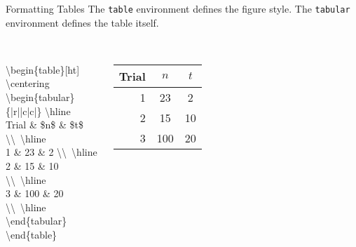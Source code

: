 \begin{frame}{Formatting Tables}
The \texttt{table} environment defines the figure style. The \texttt{tabular} environment defines the table itself.\\
~\\
\begin{columns}

\textbackslash begin\{table\}[ht] \\
\hspace{.5cm}\textbackslash centering \\
\hspace{.5cm}\textbackslash begin\{tabular\}\{|r||c|c|\} \textbackslash hline \\
\hspace{1cm}Trial \& \$n\$ \& \$t\$ \textbackslash\textbackslash~\textbackslash hline \\
\hspace{1cm}1 \& 23 \& 2 \textbackslash\textbackslash~\textbackslash hline \\
\hspace{1cm}2 \& 15 \& 10 \textbackslash\textbackslash~\textbackslash hline \\
\hspace{1cm}3 \& 100 \& 20 \textbackslash\textbackslash~\textbackslash hline \\
\hspace{.5cm}\textbackslash end\{tabular\} \\
\textbackslash end\{table\}

\begin{table}
\centering
\begin{tabular}{|r||c|c|} \hline
Trial & $n$ & $t$ \\ \hline
1 & 23 & 2 \\ \hline
2 & 15 & 10 \\ \hline
3 & 100 & 20 \\ \hline
\end{tabular}
\end{table}
\end{columns}
\end{frame}

